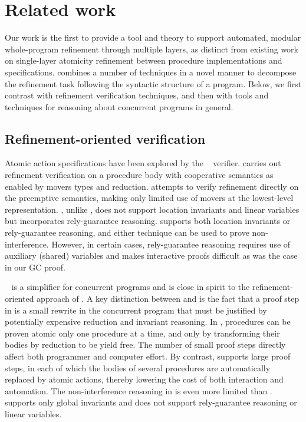 
\section{Related work}
\label{sec:related}

Our work is the first to provide a tool and theory to support automated,
modular whole-program refinement through multiple layers, as distinct from existing work on
single-layer atomicity refinement between procedure implementations and
specifications. 
\civl combines a number of techniques in a novel manner to 
decompose the refinement task following the syntactic structure of a
program. Below, we first contrast \civl with refinement
verification techniques, and then with tools and
techniques for reasoning about concurrent programs in general. 

\subsection{Refinement-oriented verification}
Atomic action specifications have been explored by the
\calvin~\cite{FlanaganFQS05,FreundQ04} verifier. 
\civl carries out refinement verification on a procedure body
with cooperative semantics as enabled by movers types and reduction.
\calvin attempts to verify refinement directly on the preemptive
semantics, making only limited use of movers at the lowest-level
representation. 
\calvin, unlike \civl, does not support location invariants and linear
variables but incorporates rely-guarantee reasoning. 
\civl supports both location
invariants or rely-guarantee reasoning, and either technique can be
used to prove non-interference.
However, in certain cases, rely-guarantee reasoning
requires use of auxiliary (shared) variables and makes interactive
proofs difficult as was the case in our GC proof. 

\QED~\cite{ElmasQT09} is a simplifier for concurrent programs and is close in spirit to the 
refinement-oriented approach of \civl.
A key distinction between \civl and \QED is the fact that a proof step in \QED is a small rewrite in the concurrent program
that must be justified by potentially expensive reduction and invariant reasoning.
In \QED, procedures can be proven atomic only one procedure at a time, and only by
transforming their bodies by reduction to be yield free. 
The number of small proof steps directly affect both programmer
and computer effort. 
By contrast, \civl supports large proof steps, in each of which the bodies of several procedures
are automatically replaced by atomic actions, thereby lowering the cost of both interaction and automation.
The non-interference reasoning in \QED is even more limited than \calvin.
\QED supports only global invariants and does not support rely-guarantee reasoning or linear variables.

